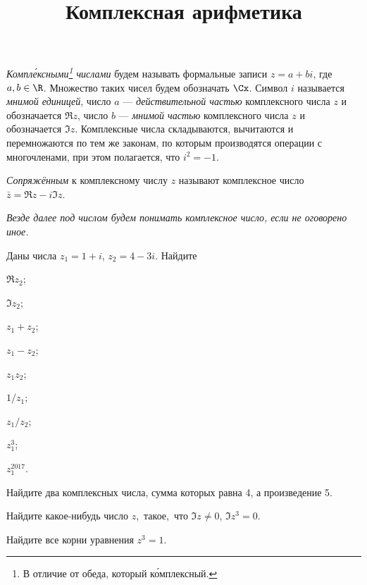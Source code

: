 \documentclass[a4paper, 12pt, num=21, date=02.09.2019]{listok}
\begin{document}
\title{Комплексная арифметика}
\maketitle{}
\begin{definition}
	\textit{Компл\'ексными\footnote{В отличие от обеда, который к\'омплексный.} числами} будем называть формальные записи $z = a + b i$, где $a, b \in \R$.
	Множество таких чисел будем обозначать $\Cx$.
	Символ $i$ называется \textit{мнимой единицей}, число $a$ --- \textit{действительной частью} комплексного числа $z$ и обозначается $\Re z$,
	число $b$ --- \textit{мнимой частью} комплексного числа $z$ и обозначается $\Im z$.
	Комплексные числа складываются, вычитаются и перемножаются по тем же законам, по которым производятся операции с
	многочленами, при этом полагается, что $i^2 = -1$.
\end{definition}
\begin{definition}
	\textit{Сопряжённым} к комплексному числу $z$ называют комплексное число $\bar{z} = \Re z - i \Im z$.
\end{definition}
\textit{Везде далее под числом будем понимать комплексное число, если не оговорено иное.}
\begin{problem}
Даны числа $z_1 = 1 + i$, $z_2 = 4 - 3i$.
Найдите
\begin{multienum}{5}
	\item $\Re z_2$;
	\item $\Im z_2$;
	\item $z_1 + z_2$;
	\item $z_1 - z_2$;
	\item $z_1z_2$;
	\item $1/z_1$;
	\item $z_1/z_2$;
	\item $z_1^3$;
	\item $z_1^{2017}$.
\end{multienum}
\end{problem}
\begin{problem}
	Найдите два комплексных числа, сумма которых равна 4, а произведение 5.
\end{problem}
\begin{problem}
\begin{probparts}
	\item Найдите какое-нибудь число $z$,~такое,~что $\Im z \ne 0$, $\Im z^3 = 0$.
	\item Найдите все корни уравнения $z^3 = 1$.
\end{probparts}
\end{problem}
\end{document}
